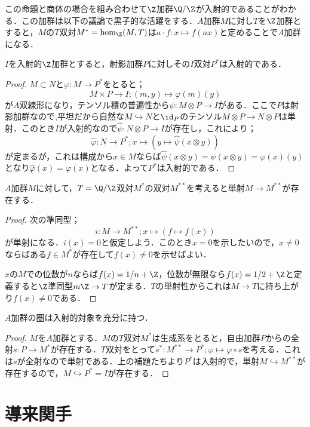 この命題と商体の場合を組み合わせて$\Z$加群$\Q/\Z$が入射的であることがわかる．この加群は以下の議論で黒子的な活躍をする．$A$加群$M$に対し$T$を$\Z$加群とすると，$M$の$T$双対$M^\ast=\hom_{\Z}(M,T)$は$a\cdot f:x\mapsto f(ax)$と定めることで$A$加群になる．
\begin{lem}
	$I$を入射的$\Z$加群とすると，射影加群$P$に対しその$I$双対$P^\ast$は入射的である．
\end{lem}
\begin{proof}
	$M\subset N$と$\varphi:M\to P^\ast$をとると；
	\[M\times P\to I;(m,y)\mapsto \varphi(m)(y)\]
	が$A$双線形になり，テンソル積の普遍性から$\psi:M\otimes P\to I$がある．ここで$P$は射影加群なので,平坦だから自然な$M\hookrightarrow N$と$\id_P$のテンソル$M\otimes P\to N\otimes P$は単射．このとき$I$が入射的なので$\hat\psi:N\otimes P\to I$が存在し，これにより；
	\[\hat\varphi:N\to P^\ast; x\mapsto (y\mapsto \hat\psi(x\otimes y))\]
	が定まるが，これは構成から$x\in M$ならば$\hat\psi(x\otimes y)=\psi(x\otimes y)=\varphi(x)(y)$となり$\hat\varphi(x)=\varphi(x)$となる．よって$P^\ast$は入射的である．
\end{proof}
\begin{lem}
	$A$加群$M$に対して，$T=\Q/\Z$双対$M^\ast$の双対$M^{\ast\ast}$を考えると単射$M\to M^{\ast\ast}$が存在する．
\end{lem}
\begin{proof}
	次の準同型；
	\[i:M\to M^{\ast\ast};x\mapsto (f\mapsto f(x))\]
	が単射になる．$i(x)=0$と仮定しよう．このとき$x=0$を示したいので，$x\neq0$ならばある$f\in M^\ast$が存在して$f(x)\neq0$を示せばよい．
	
	$x$の$M$での位数が$n$ならば$f(x)=1/n+\Z$，位数が無限なら$f(x)=1/2+\Z$と定義すると$\Z$準同型$m\Z\to T$が定まる．$T$の単射性からこれは$M\to T$に持ち上がり$f(x)\neq0$である．
\end{proof}

\begin{thm}\label{thm:加群の圏はhas enough injectives}
	$A$加群の圏は入射的対象を充分に持つ．
\end{thm}
\begin{proof}
	$M$を$A$加群とする．$M$の$T$双対$M^\ast$は生成系をとると，自由加群$P$からの全射$s:P\to M^\ast$が存在する．$T$双対をとって$s^\ast:M^{\ast\ast}\to P^\ast;\varphi\mapsto\varphi\circ s$を考える．これは$s$が全射なので単射である．上の補題たちより$P^\ast$は入射的で，単射$M\hookrightarrow M^{\ast\ast}$が存在するので，$M\hookrightarrow P^\ast=I$が存在する．
\end{proof}

\section{導来関手}

